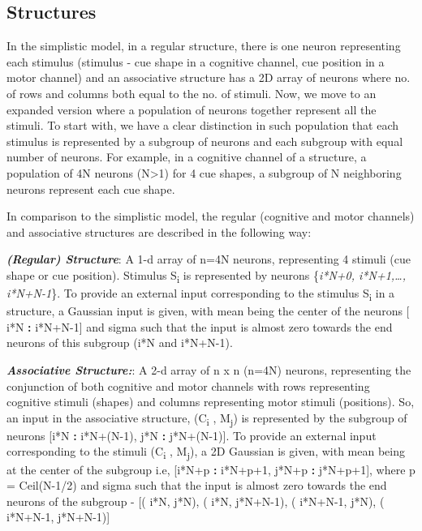 \documentclass[11pt]{article}
\begin{document}
\subsection{Structures}
In the simplistic model, in a regular structure, there is one neuron representing each stimulus (stimulus - cue shape in a cognitive channel, cue position in a motor channel) and an associative structure has a 2D array of neurons where no. of rows and columns both equal to the no. of stimuli. Now, we move to an expanded version where a population of neurons together represent all the stimuli. To start with, we have a clear distinction in such population that each stimulus is represented by a subgroup of neurons and each subgroup with equal number of neurons. For example, in a cognitive channel of a structure, a population of 4N neurons (N>1) for 4 cue shapes, a subgroup of N neighboring neurons represent each cue shape. 

In comparison to the simplistic model, the regular (cognitive and motor channels) and associative structures are described in the following way:
\\
\par
\textbf{\emph{(Regular) Structure}}:
A 1-d array of n=4N neurons, representing 4 stimuli (cue shape or cue position). Stimulus S\textsubscript{i}  is represented by neurons \{\emph{i*N+0, i*N+1,\ldots, i*N+N-1}\}. To provide an external input corresponding to the stimulus S\textsubscript{i} in a structure, a Gaussian input is given, with mean being the center of the neurons [ i*N \textbf{:}  i*N+N-1] and sigma such that the input is almost zero towards the end neurons of this subgroup (i*N and  i*N+N-1).
\\
\par
\textbf{\emph{Associative Structure:}}:
A 2-d array of n x n (n=4N) neurons, representing the conjunction of both cognitive and motor channels with rows representing cognitive stimuli (shapes) and columns representing motor stimuli (positions). So, an input in the associative structure, (C\textsubscript{i} , M\textsubscript{j}) is represented by the subgroup of neurons [i*N \textbf{:} i*N+(N-1), j*N \textbf{:} j*N+(N-1)]. To provide an external input corresponding to the stimuli (C\textsubscript{i} , M\textsubscript{j}), a 2D Gaussian is given, with mean being at the center of the subgroup i.e, 
[i*N+p \textbf{:} i*N+p+1, j*N+p \textbf{:} j*N+p+1], where p = Ceil(N-1/2) and sigma such that the input is almost zero towards the end neurons of the subgroup - [( i*N, j*N), ( i*N, j*N+N-1), ( i*N+N-1, j*N),  ( i*N+N-1, j*N+N-1)]
\end{document}
